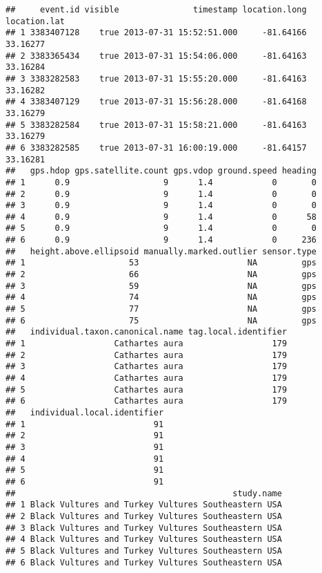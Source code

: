 \documentclass[
]{article}
\begin{document}
\begin{verbatim}
##     event.id visible               timestamp location.long location.lat
## 1 3383407128    true 2013-07-31 15:52:51.000     -81.64166     33.16277
## 2 3383365434    true 2013-07-31 15:54:06.000     -81.64163     33.16284
## 3 3383282583    true 2013-07-31 15:55:20.000     -81.64163     33.16282
## 4 3383407129    true 2013-07-31 15:56:28.000     -81.64168     33.16279
## 5 3383282584    true 2013-07-31 15:58:21.000     -81.64163     33.16279
## 6 3383282585    true 2013-07-31 16:00:19.000     -81.64157     33.16281
##   gps.hdop gps.satellite.count gps.vdop ground.speed heading
## 1      0.9                   9      1.4            0       0
## 2      0.9                   9      1.4            0       0
## 3      0.9                   9      1.4            0       0
## 4      0.9                   9      1.4            0      58
## 5      0.9                   9      1.4            0       0
## 6      0.9                   9      1.4            0     236
##   height.above.ellipsoid manually.marked.outlier sensor.type
## 1                     53                      NA         gps
## 2                     66                      NA         gps
## 3                     59                      NA         gps
## 4                     74                      NA         gps
## 5                     77                      NA         gps
## 6                     75                      NA         gps
##   individual.taxon.canonical.name tag.local.identifier
## 1                  Cathartes aura                  179
## 2                  Cathartes aura                  179
## 3                  Cathartes aura                  179
## 4                  Cathartes aura                  179
## 5                  Cathartes aura                  179
## 6                  Cathartes aura                  179
##   individual.local.identifier
## 1                          91
## 2                          91
## 3                          91
## 4                          91
## 5                          91
## 6                          91
##                                            study.name
## 1 Black Vultures and Turkey Vultures Southeastern USA
## 2 Black Vultures and Turkey Vultures Southeastern USA
## 3 Black Vultures and Turkey Vultures Southeastern USA
## 4 Black Vultures and Turkey Vultures Southeastern USA
## 5 Black Vultures and Turkey Vultures Southeastern USA
## 6 Black Vultures and Turkey Vultures Southeastern USA
\end{verbatim}
\end{document}
